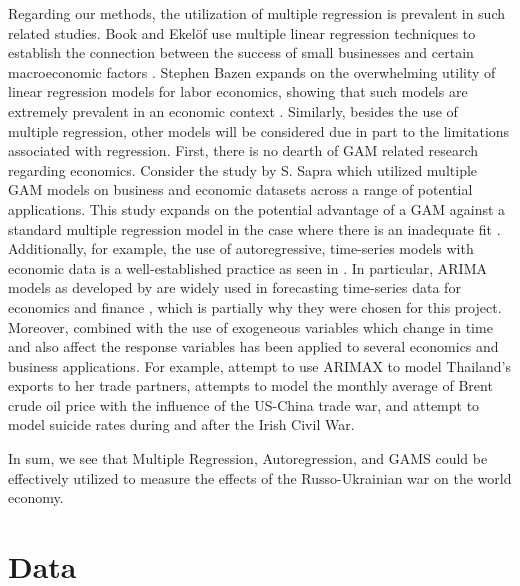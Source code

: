 \documentclass[11pt,regno]{amsart}
\theoremstyle{plain}
\numberwithin{equation}{section}
\begin{document}
Regarding our methods, the utilization of multiple regression is prevalent in such related studies. Book and Ekelöf use multiple linear regression techniques to establish the connection between the success of small businesses and certain macroeconomic factors \cite{macroeconomic_mult_linreg}. Stephen Bazen expands on the overwhelming utility of linear regression models for labor economics, showing that such models are extremely prevalent in an economic context \cite{linear_regression_economics}. Similarly, besides the use of multiple regression, other models will be considered due in part to the limitations associated with regression. First, there is no dearth of GAM related research regarding economics. Consider the study by S. Sapra which utilized multiple GAM models on business and economic datasets across a range of potential applications. This study expands on the potential advantage of a GAM against a standard multiple regression model in the case where there is an inadequate fit \cite{GAM_business}.  Additionally, for example, the use of autoregressive, time-series models with economic data is a well-established practice as seen in 
\cite{time_series_models}. In particular, ARIMA models as developed by \cite{ARIMA_original} are widely used in forecasting time-series data for economics and finance \cite{ARIMA_forecasting}, which is partially why they were chosen for this project. Moreover, combined with the use of exogeneous variables which change in time and also affect the response variables has been applied to several economics and business applications. For example, \cite{Thailand_ARIMAX} attempt to use ARIMAX to model Thailand's exports to her trade partners, \cite{US-China-ARIMAX} attempts to model the monthly average of Brent crude oil price with the influence of the US-China trade war, and  \cite{irish-civil-war-ARIMAX} attempt to model suicide rates during and after the Irish Civil War. 

In sum, we see that Multiple Regression, Autoregression, and GAMS could be effectively utilized to measure the effects of the Russo-Ukrainian war on the world economy.

% 

 

\section*{Data}
\end{document}
